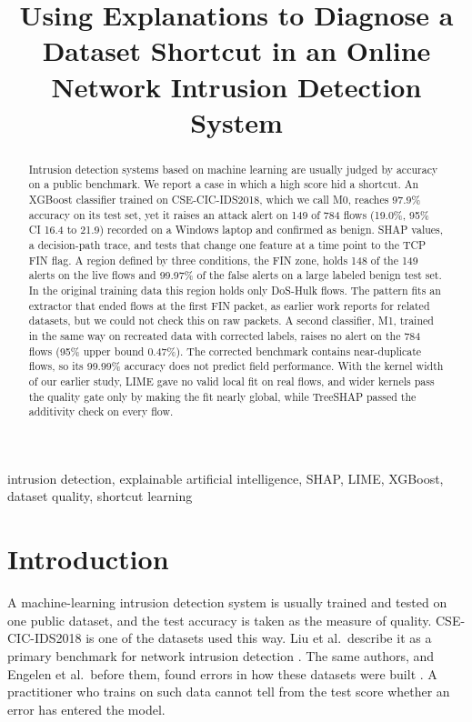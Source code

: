 \documentclass[conference]{IEEEtran}
\begin{document}
\title{Using Explanations to Diagnose a Dataset Shortcut in an Online Network Intrusion Detection System}

\author{
}

\maketitle

\begin{abstract}
Intrusion detection systems based on machine learning are usually judged by accuracy on a public benchmark. We report a case in which a high score hid a shortcut. An XGBoost classifier trained on CSE-CIC-IDS2018, which we call M0, reaches 97.9\% accuracy on its test set, yet it raises an attack alert on 149 of 784 flows (19.0\%, 95\% CI 16.4 to 21.9) recorded on a Windows laptop and confirmed as benign. SHAP values, a decision-path trace, and tests that change one feature at a time point to the TCP FIN flag. A region defined by three conditions, the FIN zone, holds 148 of the 149 alerts on the live flows and 99.97\% of the false alerts on a large labeled benign test set. In the original training data this region holds only DoS-Hulk flows. The pattern fits an extractor that ended flows at the first FIN packet, as earlier work reports for related datasets, but we could not check this on raw packets. A second classifier, M1, trained in the same way on recreated data with corrected labels, raises no alert on the 784 flows (95\% upper bound 0.47\%). The corrected benchmark contains near-duplicate flows, so its 99.99\% accuracy does not predict field performance. With the kernel width of our earlier study, LIME gave no valid local fit on real flows, and wider kernels pass the quality gate only by making the fit nearly global, while TreeSHAP passed the additivity check on every flow.
\end{abstract}

\begin{IEEEkeywords}
intrusion detection, explainable artificial intelligence, SHAP, LIME, XGBoost, dataset quality, shortcut learning
\end{IEEEkeywords}

\section{Introduction}
A machine-learning intrusion detection system is usually trained and tested on one public dataset, and the test accuracy is taken as the measure of quality. CSE-CIC-IDS2018 \cite{sharafaldin2018} is one of the datasets used this way. Liu et al.\ describe it as a primary benchmark for network intrusion detection \cite{liu2022}. The same authors, and Engelen et al.\ before them, found errors in how these datasets were built \cite{engelen2021,liu2022}. A practitioner who trains on such data cannot tell from the test score whether an error has entered the model.
\end{document}
